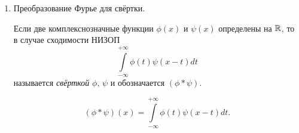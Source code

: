 \documentclass[../../main.tex]{subfiles}
\newcommand{\intii}{\int\limits_{-\infty}^{+\infty}}
\begin{document}
\begin{enumerate}
\begin{proof}
    Т.к. производная $f'$ абсолютно интегрируема, то тем самым получаем, что 
    \[\exists p = \lim_{x \to \infty} f(x) \stackrel{\eqref{lec21:28}}{=} 
    \lim_{x \to \infty}\left(f(0) 
    + \int\limits_{0}^{x}f'(t)dt \right) \in \R.\]
    Покажем, что $p = 0$. Если предположить, что, например, $p >0$, то для всех 
    достаточно больших $x \in \R \implies |f(x)| \geq \frac p2$, а тогда 
    $\intii |f(x)|dx$ расходится по признаку сравнения. Поэтому $|p| = 0 
    \implies p = 0$.
    Таким образом,
    \[ \lim_{x \to +\infty} f(x) = 0.\]
    Аналогично доказывается, что
    \[ \lim_{x \to -\infty} f(x) = 0.\]
    Отсюда, в силу формулы интегрирования по частям, получаем
    \begin{multline*}
      F[f'](y) = \frac{1}{\sqrt{2\pi}} \intii f'(t)e^{ity}dt = 
      \frac{1}{\sqrt{2\pi}} \intii e^{iyt}d(f(t)) =\\= \frac{1}{\sqrt{2\pi}} 
      \left(f(t) e^{iyt}\bigg|_{t = -\infty}^{t = +\infty} \right) - 
      \frac{1}{\sqrt{2\pi}} \intii f(t)f(e^{iyt}) = -iyF(y).
    \end{multline*}
  \end{proof}
  
  \item Преобразование Фурье для свёртки.
  
  Если две комплекснозначные функции $\phi(x)$ и $\psi(x)$ определены 
  на $\mathbb{R}$, то в случае сходимости НИЗОП
  \[ \intii \phi(t)\psi(x - t)dt \]
  называется \emph{свёрткой} $\phi, \, \psi$ и обозначается $(\phi * \psi)$.
  
  \begin{equation}
    \label{lec21:29}
    (\phi * \psi)(x) = \intii \phi(t)\psi(x - t)dt.
  \end{equation}
\end{enumerate}
\end{document}
